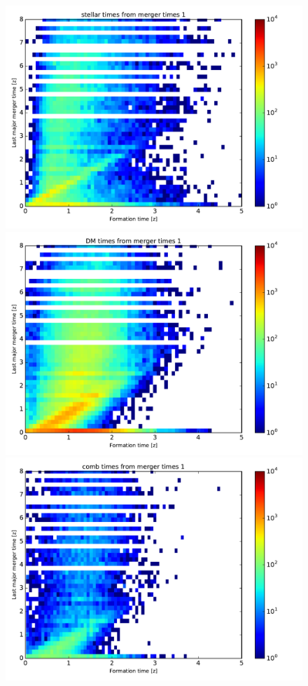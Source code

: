 \documentclass[fleqn,usenatbib]{mnras}
\begin{document}
\begin{figure}
\centering
\includegraphics[scale=0.27]{avgProp/stellar_2DhistTimes_1.pdf}
\includegraphics[scale=0.27]{avgProp/DM_2DhistTimes_1.pdf}
\includegraphics[scale=0.27]{avgProp/comb_2DhistTimes_1.pdf}

\end{figure}
\end{document}

